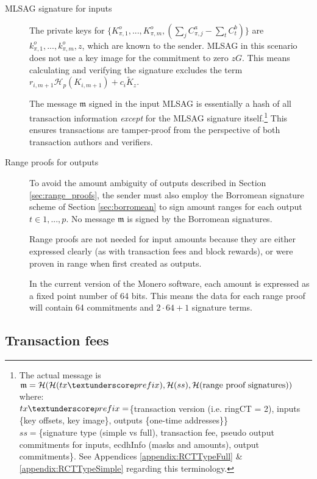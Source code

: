 \begin{description}
	
	\item [MLSAG signature for inputs]
	The private keys for 
	\(\{K_{\pi,1}^o,...,K_{\pi,m}^o, (\sum\limits_j C_{\pi, j}^a - \sum\limits_t C^b_{t})\}\)
	are \(k_{\pi,1}^o,...,k_{\pi,m}^o, z\), which are known to the sender. 
	MLSAG in this scenario does not use a key image for the commitment to zero $z G$. This means calculating and verifying the signature excludes the term $r_{i,m+1} \mathcal{H}_p(K_{i,m+1}) + c_i \tilde{K}_z$.
	
	The message $\mathfrak{m}$ signed in the input MLSAG is essentially a hash of all transaction information {\em except} for the MLSAG signature itself.\footnote{\label{MLSAG_message}The actual message is $\mathfrak{m} = \mathcal{H}(\mathcal{H}(tx\textunderscore prefix),\mathcal{H}(ss),\mathcal{H}(\text{range proof signatures}))$ where:\\
	$tx\textunderscore prefix = $\{transaction version (i.e. ringCT = 2), inputs \{key offsets, key image\}, outputs \{one-time addresses\}\}\\ 
	$ss = $\{signature type (simple vs full), transaction fee, pseudo output commitments for inputs, ecdhInfo (masks and amounts), output commitments\}. See Appendices \ref{appendix:RCTTypeFull} \& \ref{appendix:RCTTypeSimple} regarding this terminology.} This ensures transactions are tamper-proof from the perspective of both transaction authors and verifiers.
	
	\item[Range proofs for outputs]
	To avoid the amount ambiguity of outputs described in Section  \ref{sec:range_proofs}, the sender must also employ the Borromean signature scheme of Section \ref{sec:borromean} to sign amount ranges for each output $t \in {1, ..., p}$. No message $
\mathfrak{m}$ is signed by the Borromean signatures.
	
	Range proofs are not needed for input amounts because they are either expressed clearly (as with transaction fees and block rewards), or were proven in range when first created as outputs.
	
	In the current version of the Monero software, each amount is expressed as a fixed point number of 64 bits. This means the data for each range proof will contain 64 commitments and $2 \cdot 64 + 1$ signature terms.
	
\end{description}


\subsection{Transaction fees}

